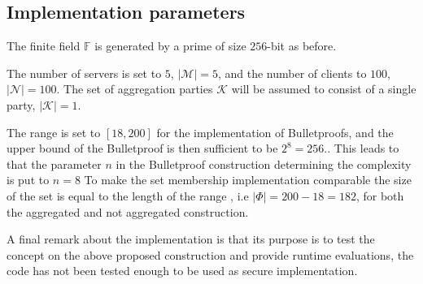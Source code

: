 
\subsection*{Implementation parameters}
The finite field $\mathds{F}$ is generated by a prime of size $256$-bit as before. 

The number of servers is set to $5$, $|\mathcal{M}|=5$,  and the number of clients to $100$, $|\mathcal{N}|=100$.  The set of aggregation parties $\mathcal{K}$ will be assumed to consist of a single party, $|\mathcal{K}|=1$.

The range is set to $[18,200]$ for the implementation of Bulletproofs, and the upper bound of the Bulletproof is then sufficient to be $2^8=256. $. This leads to that the parameter $n$ in the Bulletproof construction determining the complexity is put to $n=8$   To make the set membership implementation comparable the size of the set is equal to the length of the range , i.e $|\Phi|=200-18 = 182$, for both the aggregated and not aggregated construction. 

A final remark about the implementation is that its purpose is to test the concept on the above proposed construction and provide runtime evaluations, the code has not been tested enough to be used as secure implementation.


